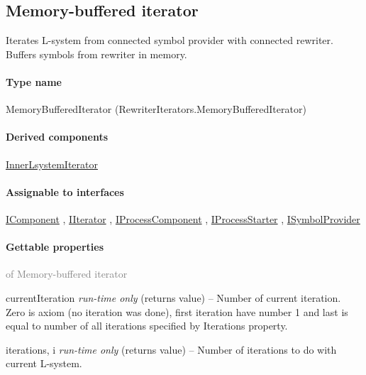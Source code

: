 

\subsection{Memory-buffered iterator}
\label{Malsys.Processing.Components.RewriterIterators.MemoryBufferedIterator}
Iterates L-system from connected symbol provider with connected rewriter.
            Buffers symbols from rewriter in memory.\paragraph{Type name}
MemoryBufferedIterator (RewriterIterators.MemoryBufferedIterator) 	\paragraph{Derived components}
		\hyperref[Malsys.Processing.Components.RewriterIterators.InnerLsystemIterator]{InnerLsystemIterator}%
	\paragraph{Assignable to interfaces}
		\hyperref[Malsys.Processing.Components.IComponent]{IComponent}%
, 		\hyperref[Malsys.Processing.Components.IIterator]{IIterator}%
, 		\hyperref[Malsys.Processing.Components.IProcessComponent]{IProcessComponent}%
, 		\hyperref[Malsys.Processing.Components.IProcessStarter]{IProcessStarter}%
, 		\hyperref[Malsys.Processing.Components.ISymbolProvider]{ISymbolProvider}%
	\paragraph{Gettable properties}\textcolor{gray}{of Memory-buffered iterator}
	\begin{description*}
		\item[currentIteration]
 \textit{run-time only} 		(returns value)
			-- Number of current iteration. Zero is axiom (no iteration was done), first iteration have number 1
            and last is equal to number of all iterations specified by Iterations property.
		\item[iterations, i]
 \textit{run-time only} 		(returns value)
			-- Number of iterations to do with current L-system.
	\end{description*}
